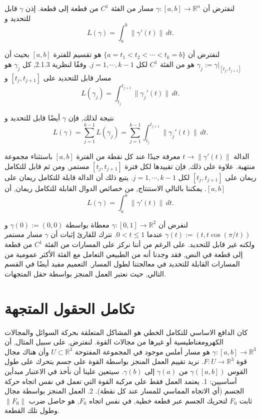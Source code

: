 \begin{lemma}
لنفترض أن \( \gamma : [a, b] \to \mathbb{R}^n \) مسار من الفئة \( C^1 \) من قطعة إلى قطعة. إذن \( \gamma \) قابل للتحديد و
\[ L(\gamma) = \int_a^b \|\gamma'(t)\| \, dt. \]
\end{lemma}
\begin{demonstration}

لنفترض أن \(\{a = t_1 < t_2 < \cdots < t_k = b\}\) هو تقسيم للفترة $[a, b]$ بحيث أن \( \gamma_j := \gamma|_{[t_j, t_{j+1}]} \) هو من الفئة \( C^1 \) لكل \( j = 1, \cdots, k - 1 \). وفقًا لنظرية 2.1.3, كل \( \gamma_j \) هو مسار قابل للتحديد على $[t_j, t_{j+1}]$ و
\[ L(\gamma_j) = \int_{t_j}^{t_{j+1}} \|\gamma_j'(t)\| \, dt. \]

نتيجة لذلك, فإن \( \gamma \) أيضًا قابل للتحديد و
\[ L(\gamma) = \sum_{j=1}^{k-1} L(\gamma_j) = \sum_{j=1}^{k-1} \int_{t_j}^{t_{j+1}} \|\gamma_j'(t)\| \, dt. \]

الدالة \( t \to \|\gamma'(t)\| \) معرفة جيدًا عند كل نقطة من الفترة $[a, b]$ باستثناء مجموعة منتهية. علاوة على ذلك, فإن تقييدها لكل فترة $[t_j, t_{j+1}]$ مستمر, ومن ثم قابل للتكامل ريمان على $[t_j, t_{j+1}]$ لكل \( j = 1, \cdots, k - 1 \). يتبع ذلك أن الدالة قابلة للتكامل ريمان على $[a, b]$. يمكننا بالتالي الاستنتاج, من خصائص الدوال القابلة للتكامل ريمان, أن
\[ L(\gamma) = \int_a^b \|\gamma'(t)\| \, dt. \]
\end{demonstration}

لنفرض أن \( \gamma : [0, 1] \to \mathbb{R}^2 \) معطاة بواسطة \( \gamma(0) := (0, 0) \) و \( \gamma(t) := (t, t \cos(\pi/t)) \) عندما \( 0 < t \leq 1 \). نترك للقارئ إثبات أن \( \gamma \) مسار مستمر ولكنه غير قابل للتحديد. على الرغم من أننا نركز على المسارات من الفئة \( C^1 \) من قطعة إلى قطعة في النص, فقد وجدنا أنه من الطبيعي التعامل مع الفئة الأكثر عمومية من المسارات القابلة للتحديد في معالجتنا لطول المسار. التعميم مفيد أيضًا في القسم التالي, حيث نعتبر العمل المنجز بواسطة حقل المتجهات.
\section{تكامل الحقول المتجهة}
كان الدافع الاساسي للتكامل الخطي هو المشاكل المتعلقة بحركة السوائل والمجالات الكهرومغناطيسية أو غيرها من مجالات القوة. لنفترض, على سبيل المثال, أن \( \gamma : [a, b] \to \mathbb{R}^3 \) هو مسار أملس موجود في المجموعة المفتوحة \( U \subset \mathbb{R}^3 \) وأن هناك مجال قوة \( F : U \to \mathbb{R}^3 \). نريد تقييم العمل المنجز بواسطة القوة على جسم يتحرك على طول القوس \( \gamma([a, b]) \) من \( \gamma(a) \) إلى \( \gamma(b) \). سيتعين علينا أن نأخذ في الاعتبار مبدأين أساسيين:
1. يعتمد العمل فقط على مركبة القوة التي تعمل في نفس اتجاه حركة الجسم (أي الاتجاه المماسي للمسار عند كل نقطة).
2. العمل المنجز بواسطة مجال ثابت \( F_0 \) لتحريك الجسم عبر قطعة خطية, في نفس اتجاه \( F_0 \), هو حاصل ضرب \( \|F_0\| \) وطول تلك القطعة.


